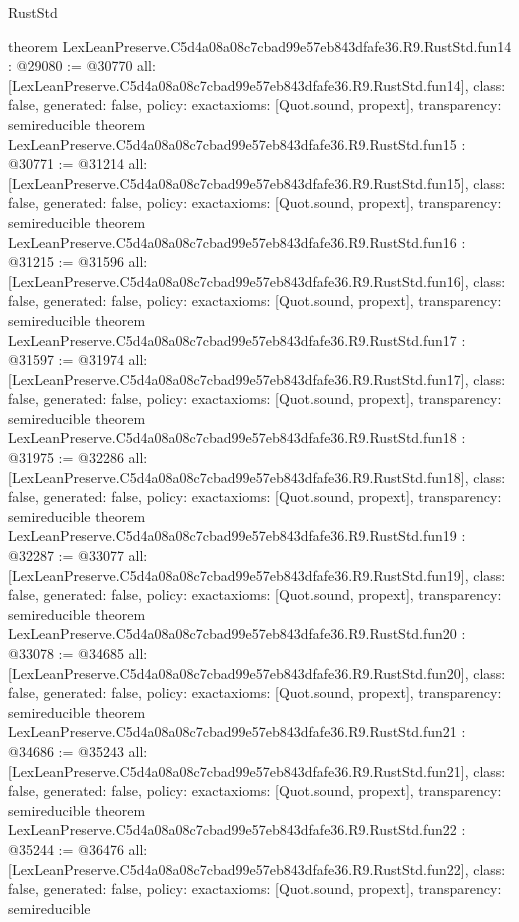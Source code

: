 \begin{lexlean}{RustStd}
\begin{coremodule}
{}
theorem LexLeanPreserve.C5d4a08a08c7cbad99e57eb843dfafe36.R9.RustStd.fun14 : @29080 := @30770 {
  all: [LexLeanPreserve.C5d4a08a08c7cbad99e57eb843dfafe36.R9.RustStd.fun14],
  class: false,
  generated: false,
  policy: exact{axioms: [Quot.sound, propext]},
  transparency: semireducible
}
theorem LexLeanPreserve.C5d4a08a08c7cbad99e57eb843dfafe36.R9.RustStd.fun15 : @30771 := @31214 {
  all: [LexLeanPreserve.C5d4a08a08c7cbad99e57eb843dfafe36.R9.RustStd.fun15],
  class: false,
  generated: false,
  policy: exact{axioms: [Quot.sound, propext]},
  transparency: semireducible
}
theorem LexLeanPreserve.C5d4a08a08c7cbad99e57eb843dfafe36.R9.RustStd.fun16 : @31215 := @31596 {
  all: [LexLeanPreserve.C5d4a08a08c7cbad99e57eb843dfafe36.R9.RustStd.fun16],
  class: false,
  generated: false,
  policy: exact{axioms: [Quot.sound, propext]},
  transparency: semireducible
}
theorem LexLeanPreserve.C5d4a08a08c7cbad99e57eb843dfafe36.R9.RustStd.fun17 : @31597 := @31974 {
  all: [LexLeanPreserve.C5d4a08a08c7cbad99e57eb843dfafe36.R9.RustStd.fun17],
  class: false,
  generated: false,
  policy: exact{axioms: [Quot.sound, propext]},
  transparency: semireducible
}
theorem LexLeanPreserve.C5d4a08a08c7cbad99e57eb843dfafe36.R9.RustStd.fun18 : @31975 := @32286 {
  all: [LexLeanPreserve.C5d4a08a08c7cbad99e57eb843dfafe36.R9.RustStd.fun18],
  class: false,
  generated: false,
  policy: exact{axioms: [Quot.sound, propext]},
  transparency: semireducible
}
theorem LexLeanPreserve.C5d4a08a08c7cbad99e57eb843dfafe36.R9.RustStd.fun19 : @32287 := @33077 {
  all: [LexLeanPreserve.C5d4a08a08c7cbad99e57eb843dfafe36.R9.RustStd.fun19],
  class: false,
  generated: false,
  policy: exact{axioms: [Quot.sound, propext]},
  transparency: semireducible
}
theorem LexLeanPreserve.C5d4a08a08c7cbad99e57eb843dfafe36.R9.RustStd.fun20 : @33078 := @34685 {
  all: [LexLeanPreserve.C5d4a08a08c7cbad99e57eb843dfafe36.R9.RustStd.fun20],
  class: false,
  generated: false,
  policy: exact{axioms: [Quot.sound, propext]},
  transparency: semireducible
}
theorem LexLeanPreserve.C5d4a08a08c7cbad99e57eb843dfafe36.R9.RustStd.fun21 : @34686 := @35243 {
  all: [LexLeanPreserve.C5d4a08a08c7cbad99e57eb843dfafe36.R9.RustStd.fun21],
  class: false,
  generated: false,
  policy: exact{axioms: [Quot.sound, propext]},
  transparency: semireducible
}
theorem LexLeanPreserve.C5d4a08a08c7cbad99e57eb843dfafe36.R9.RustStd.fun22 : @35244 := @36476 {
  all: [LexLeanPreserve.C5d4a08a08c7cbad99e57eb843dfafe36.R9.RustStd.fun22],
  class: false,
  generated: false,
  policy: exact{axioms: [Quot.sound, propext]},
  transparency: semireducible
}
\end{coremodule}
\end{lexlean}
